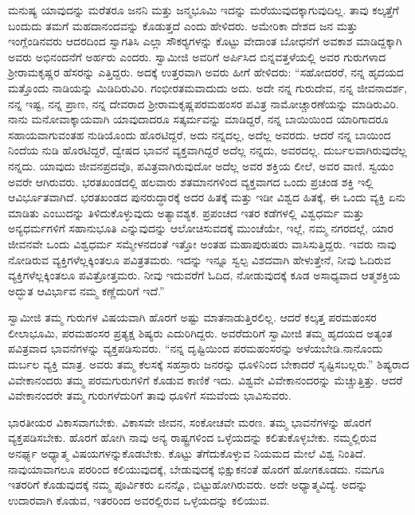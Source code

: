  ಮನುಷ್ಯ ಯಾವುದನ್ನು ಮರೆತರೂ ಜನನಿ ಮತ್ತು ಜನ್ಮಭೂಮಿ ಇದನ್ನು ಮರೆಯುವುದಕ್ಕಾಗುವುದಿಲ್ಲ. ತಾವು ಕಲ್ಕತ್ತೆಗೆ ಬಂದುದು ತಮಗೆ ಮಹದಾನಂದವನ್ನು ಕೊಡುತ್ತದೆ ಎಂದು ಹೇಳಿದರು. ಅಮೇರಿಕಾ ದೇಶದ ಜನ ಮತ್ತು ಇಂಗ್ಲೆಂಡಿನವರು ಆದರದಿಂದ ಸ್ವಾಗತಿಸಿ ಎಲ್ಲಾ ಸೌಕರ‍್ಯಗಳನ್ನು ಕೊಟ್ಟು ವೇದಾಂತ ಬೋಧನೆಗೆ ಅವಕಾಶ ಮಾಡಿದ್ದಕ್ಕಾಗಿ ಅವರು ಅಭಿನಂದನೆಗೆ ಅರ್ಹರು ಎಂದರು. ಸ್ವಾಮೀಜಿ ಅವರಿಗೆ ಅರ್ಪಿಸಿದ ಬಿನ್ನವತ್ತಳೆಯಲ್ಲಿ ಅವರ ಗುರುಗಳಾದ ಶ‍್ರೀರಾಮಕೃಷ್ಣರ ಹೆಸರನ್ನು ಎತ್ತಿದ್ದರು. ಅದಕ್ಕೆ ಉತ್ತರವಾಗಿ ಅವರು ಹೀಗೆ ಹೇಳಿದರು: “ಸಹೋದರರೆ, ನನ್ನ ಹೃದಯದ ಮತ್ತೊಂದು ನಾಡಿಯನ್ನು ಮಿಡಿದಿರುವಿರಿ. ಗಂಭೀರತಮವಾದುದು ಅದು. ಅದೇ ನನ್ನ ಗುರುದೇವ, ನನ್ನ ಜೀವನಾದರ್ಶ, ನನ್ನ ಇಷ್ಟ, ನನ್ನ ಪ್ರಾಣ, ನನ್ನ ದೇವರಾದ ಶ‍್ರೀರಾಮಕೃಷ್ಣಪರಮಹಂಸರ ಪವಿತ್ರ ನಾಮೋಚ್ಚಾರಣೆಯನ್ನು ಮಾಡಿರುವಿರಿ. ನಾನು ಮನೋವಾಕ್ಕಾಯವಾಗಿ ಯಾವುದಾದರೂ ಸತ್ಕರ್ಮವನ್ನು ಮಾಡಿದ್ದರೆ, ನನ್ನ ಬಾಯಿಯಿಂದ ಯಾರಿಗಾದರೂ ಸಹಾಯವಾಗುವಂತಹ ನುಡಿಯೊಂದು ಹೊರಟಿದ್ದರೆ, ಅದು ನನ್ನದಲ್ಲ, ಅದೆಲ್ಲ ಅವರದು. ಆದರೆ ನನ್ನ ಬಾಯಿಂದ ನಿಂದೆಯ ನುಡಿ ಹೊರಟಿದ್ದರೆ, ದ್ವೇಷದ ಭಾವನೆ ವ್ಯಕ್ತವಾಗಿದ್ದರೆ ಅದೆಲ್ಲ ನನ್ನದು, ಅವರದಲ್ಲ. ದುರ್ಬಲವಾಗಿರುವುದೆಲ್ಲ ನನ್ನದು. ಯಾವುದು ಜೀವನಪ್ರದವೊ, ಪವಿತ್ರವಾಗಿರುವುದೋ ಅದೆಲ್ಲ ಅವರ ಶಕ್ತಿಯ ಲೀಲೆ, ಅವರ ವಾಣಿ. ಸ್ವಯಂ ಅವರೇ ಆಗಿರುವರು. ಭರತಖಂಡದಲ್ಲಿ ಹಲವಾರು ಶತಮಾನಗಳಿಂದ ವ್ಯಕ್ತವಾಗದ ಒಂದು ಪ್ರಚಂಡ ಶಕ್ತಿ ಇಲ್ಲಿ ಆವಿರ್ಭೂತವಾಗಿದೆ. ಭರತಖಂಡದ ಪುನರುದ್ಧಾರಕ್ಕೆ ಅದರ ಹಿತಕ್ಕೆ ಮತ್ತು ಇಡೀ ವಿಶ್ವದ ಹಿತಕ್ಕೆ, ಈ ಒಂದು ವ್ಯಕ್ತಿ ಏನು ಮಾಡಿತು ಎಂಬುದನ್ನು ತಿಳಿದುಕೊಳ್ಳುವುದು ಅತ್ಯಾವಶ್ಯಕ. ಪ್ರಪಂಚದ ಇತರ ಕಡೆಗಳಲ್ಲಿ ವಿಶ್ವಧರ್ಮ ಮತ್ತು ಅನ್ಯಧರ್ಮಗಳಿಗೆ ಸಹಾನುಭೂತಿ ಎನ್ನುವುದನ್ನು ಆಲೋಚಿಸುವದಕ್ಕೆ ಮುಂಚೆಯೇ, ಇಲ್ಲೆ, ನಮ್ಮ ನಗರದಲ್ಲೆ, ಯಾರ ಜೀವನವೇ ಒಂದು ವಿಶ್ವಧರ್ಮ ಸಮ್ಮೇಳನದಂತೆ ಇತ್ತೋ ಅಂತಹ ಮಹಾಪುರುಷರು ವಾಸಿಸುತ್ತಿದ್ದರು. ಇವರು ನಾವು ನೋಡಿರುವ ವ್ಯಕ್ತಿಗಳೆಲ್ಲಕ್ಕಿಂತಲೂ ಪವಿತ್ರತಮರು. ಇದನ್ನು ಇನ್ನೂ ಸ್ವಲ್ಪ ವಿಶದವಾಗಿ ಹೇಳುತ್ತೇನೆ, ನೀವು ಓದಿರುವ ವ್ಯಕ್ತಿಗಳೆಲ್ಲಕ್ಕಿಂತಲೂ ಪವಿತ್ರೋತ್ತಮರು. ನೀವು ಇದುವರೆಗೆ ಓದಿದ, ನೋಡುವುದಕ್ಕೆ ಕೂಡ ಅಸಾಧ್ಯವಾದ ಆತ್ಮಶಕ್ತಿಯ ಅದ್ಭುತ ಆವಿರ್ಭಾವ ನಮ್ಮ ಕಣ್ಣೆದುರಿಗೆ ಇದೆ.” 

 ಸ್ವಾಮೀಜಿ ತಮ್ಮ ಗುರುಗಳ ವಿಷಯವಾಗಿ ಹೊರಗೆ ಅಷ್ಟು ಮಾತನಾಡುತ್ತಿರಲಿಲ್ಲ. ಆದರೆ ಕಲ್ಕತ್ತ ಪರಮಹಂಸರ ಲೀಲಾಭೂಮಿ, ಪರಮಹಂಸರ ಪ್ರತ್ಯಕ್ಷ ಶಿಷ್ಯರು ಎದುರಿಗಿದ್ದರು. ಅವರೆದುರಿಗೆ ಸ್ವಾಮೀಜಿ ತಮ್ಮ ಹೃದಯದ ಅತ್ಯಂತ ಪವಿತ್ರವಾದ ಭಾವನೆಗಳನ್ನು ವ್ಯಕ್ತಪಡಿಸುವರು. “ನನ್ನ ದೃಷ್ಟಿಯಿಂದ ಪರಮಹಂಸರನ್ನು ಅಳೆಯಬೇಡಿ.\break ನಾನೊಂದು ದುರ್ಬಲ ವ್ಯಕ್ತಿ ಮಾತ್ರ. ಅವರು ತಮ್ಮ ಕೆಲಸಕ್ಕೆ ಸಹಸ್ರಾರು ಜನರನ್ನು ಧೂಳಿನಿಂದ ಬೇಕಾದರೆ ಸೃಷ್ಟಿಸಬಲ್ಲರು.” ಶಿಷ್ಯರಾದ ವಿವೇಕಾನಂದರು ತಮ್ಮ ಪರಮಗುರುಗಳಿಗೆ ಕೊಡುವ ಕಾಣಿಕೆ ಇದು. ವಿಶ್ವವೇ ವಿವೇಕಾನಂದರನ್ನು ಮೆಚ್ಚುತ್ತಿತ್ತು. ಆದರೆ ವಿವೇಕಾನಂದರೇ ತಮ್ಮ ಗುರುಗಳೆದುರಿಗೆ ತಾವು ಧೂಳಿಗೆ ಸಮವೆಂದು ಭಾವಿಸುವರು. 

 ಭಾರತೀಯರ ವಿಕಾಸವಾಗಬೇಕು. ವಿಕಾಸವೇ ಜೀವನ, ಸಂಕೋಚವೇ ಮರಣ. ತಮ್ಮ ಭಾವನೆಗಳನ್ನು ಹೊರಗೆ ವ್ಯಕ್ತಪಡಿಸಬೇಕು. ಹೊರಗೆ ಹೋಗಿ ನಾವು ಅನ್ಯ ರಾಷ್ಟ್ರಗಳಿಂದ ಒಳ್ಳೆಯದನ್ನು ಕಲಿತುಕೊಳ್ಳಬೇಕು. ನಮ್ಮಲ್ಲಿರುವ ಅನರ್ಘ್ಯ ಅಧ್ಯಾತ್ಮ ವಿಷಯಗಳನ್ನು\break ಕೊಡಬೇಕು. ಕೊಟ್ಟು ತೆಗೆದುಕೊಳ್ಳುವ ನಿಯಮದ ಮೇಲೆ ವಿಶ್ವ ನಿಂತಿದೆ. ನಾವು\break ಯಾವಾಗಲೂ ಪರರಿಂದ ಕಲಿಯುವುದಕ್ಕೆ, ಬೇಡುವುದಕ್ಕೆ ಭಿಕ್ಷುಕನಂತೆ ಹೊರಗೆ ಹೋಗಕೂಡದು. ನಮಗೂ ಇತರರಿಗೆ ಕೊಡುವುದಕ್ಕೆ ನಮ್ಮ ಪೂರ್ವಿಕರು ಏನನ್ನೊ, ಬಿಟ್ಟುಹೋಗಿರುವರು. ಅದೇ ಅಧ್ಯಾತ್ಮವಿದ್ಯೆ. ಅದನ್ನು ಉದಾರವಾಗಿ ಕೊಡುವ, ಇತರರಿಂದ ಅವರಲ್ಲಿರುವ ಒಳ್ಳೆಯದನ್ನು ಕಲಿಯುವ. 

